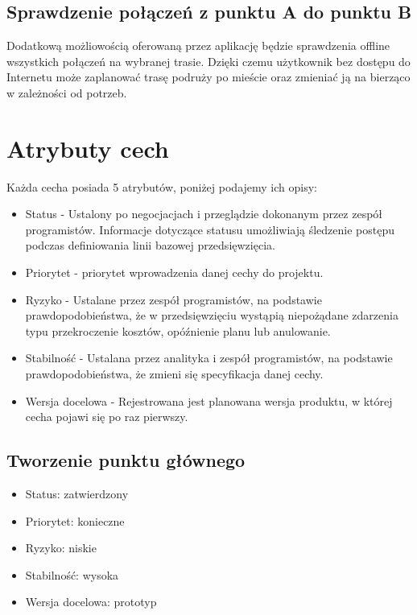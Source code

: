 \documentclass[12pt,a4paper]{article}
\begin{document}
	\subsection{Sprawdzenie połączeń z punktu A do punktu B}
	Dodatkową możliowością oferowaną przez aplikację będzie sprawdzenia offline wszystkich połączeń na wybranej trasie. Dzięki czemu użytkownik bez dostępu do Internetu może zaplanować trasę podruży po mieście oraz zmieniać ją na bierząco w zależności od potrzeb.

	\newpage

\section{Atrybuty cech}
	
Każda cecha posiada 5 atrybutów, poniżej podajemy ich opisy:
\begin{itemize}
    \item Status - Ustalony po negocjacjach i przeglądzie dokonanym przez zespół programistów. Informacje dotyczące statusu umożliwiają śledzenie postępu podczas definiowania linii bazowej przedsięwzięcia.

    \item Priorytet - priorytet wprowadzenia danej cechy do projektu.

    \item Ryzyko - Ustalane przez zespół programistów, na podstawie prawdopodobieństwa, że w przedsięwzięciu wystąpią niepożądane zdarzenia typu przekroczenie kosztów, opóźnienie planu lub anulowanie.

    \item Stabilność - Ustalana przez analityka i zespół programistów, na podstawie prawdopodobieństwa, że zmieni się specyfikacja danej cechy.

    \item Wersja docelowa - Rejestrowana jest planowana wersja produktu, w której cecha pojawi się po raz pierwszy.
\end{itemize}


	\subsection{Tworzenie punktu głównego}
\begin{itemize}
    \item Status: zatwierdzony
    \item Priorytet: konieczne
    \item Ryzyko: niskie
    \item Stabilność: wysoka
    \item Wersja docelowa: prototyp
\end{itemize}
\end{document}
